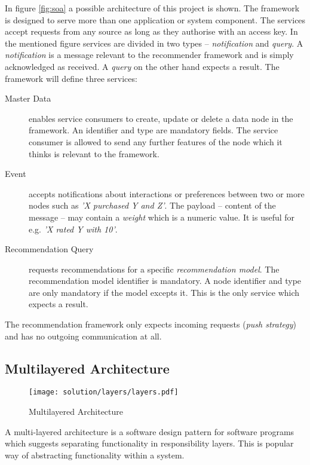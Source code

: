 In figure \ref{fig:soa} a possible architecture of this project is shown. The framework is designed to serve more than one application or system component. The services accept requests from any source as long as they authorise with an access key. In the mentioned figure services are divided in two types -- \emph{notification} and \emph{query}. A \emph{notification} is a message relevant to the recommender framework and is simply acknowledged as received. A \emph{query} on the other hand expects a result. The framework will define three services:

\begin{description}
    \item[Master Data] enables service consumers to create, update or delete a data node in the framework. An identifier and type are mandatory fields. The service consumer is allowed to send any further features of the node which it thinks is relevant to the framework.
    \item[Event] accepts notifications about interactions or preferences between two or more nodes such as \emph{'X purchased Y and Z'}. The payload -- content of the message -- may contain a \emph{weight} which is a numeric value. It is useful for e.g. \emph{'X rated Y with 10'}.
    \item[Recommendation Query] requests recommendations for a specific \emph{recommendation model}. The recommendation model identifier is mandatory. A node identifier and type are only mandatory if the model excepts it. This is the only service which expects a result.
\end{description}

The recommendation framework only expects incoming requests (\emph{push strategy}) and has no outgoing communication at all.

\subsection{Multilayered Architecture}
\label{sol-design-layer}

\begin{figure}[ht]
    \texttt{[image: solution/layers/layers.pdf]}
    \caption{Multilayered Architecture}
    \label{fig:layers}
\end{figure}

A multi-layered architecture is a software design pattern for software programs which suggests separating functionality in responsibility layers. This is popular way of abstracting functionality within a system.

